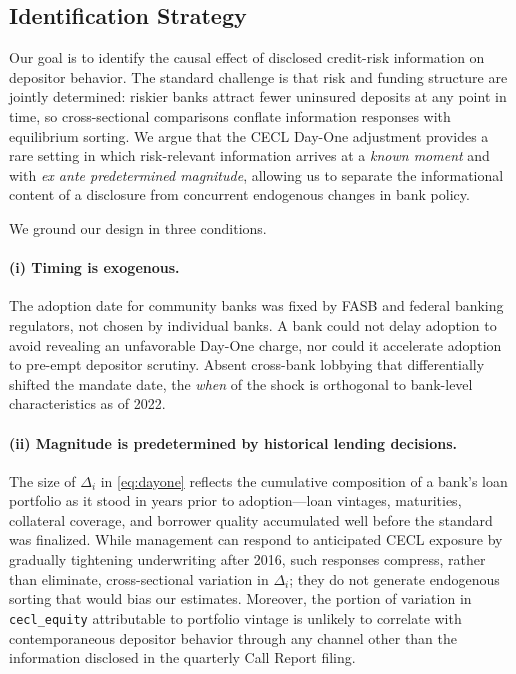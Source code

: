 \subsection{Identification Strategy}
\label{sec:background:id}

Our goal is to identify the causal effect of disclosed credit-risk information on
depositor behavior. The standard challenge is that risk and funding structure are
jointly determined: riskier banks attract fewer uninsured deposits at any point in
time, so cross-sectional comparisons conflate information responses with
equilibrium sorting. We argue that the CECL Day-One adjustment provides a rare
setting in which risk-relevant information arrives at a \textit{known moment} and
with \textit{ex ante predetermined magnitude}, allowing us to separate the
informational content of a disclosure from concurrent endogenous changes in bank
policy.

We ground our design in three conditions.

\paragraph{(i) Timing is exogenous.}
The adoption date for community banks was fixed by FASB and federal banking
regulators, not chosen by individual banks. A bank could not delay adoption to
avoid revealing an unfavorable Day-One charge, nor could it accelerate adoption to
pre-empt depositor scrutiny. Absent cross-bank lobbying that differentially shifted
the mandate date, the \textit{when} of the shock is orthogonal to bank-level
characteristics as of 2022.

\paragraph{(ii) Magnitude is predetermined by historical lending decisions.}
The size of $\Delta_i$ in \eqref{eq:dayone} reflects the cumulative composition
of a bank's loan portfolio as it stood in years prior to adoption—loan vintages,
maturities, collateral coverage, and borrower quality accumulated well before the
standard was finalized. While management can respond to anticipated CECL exposure
by gradually tightening underwriting after 2016, such responses compress, rather
than eliminate, cross-sectional variation in $\Delta_i$; they do not generate
endogenous sorting that would bias our estimates. Moreover, the portion of
variation in \texttt{cecl\_equity} attributable to portfolio vintage is unlikely
to correlate with contemporaneous depositor behavior through any channel other than
the information disclosed in the quarterly Call Report filing.

